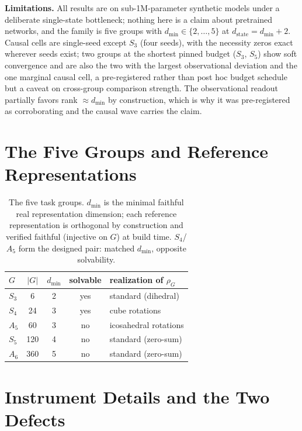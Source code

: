 \documentclass{article}
\newcommand{\dmin}{d_{\min}}
\newcommand{\dstate}{d_{\mathrm{state}}}
\begin{document}
\textbf{Limitations.} All results are on sub-1M-parameter synthetic
models under a deliberate single-state bottleneck; nothing here is a
claim about pretrained networks, and the family is five groups with
$\dmin \in \{2,\dots,5\}$ at $\dstate = \dmin + 2$. Causal cells are
single-seed except $S_3$ (four seeds), with the necessity zeros exact
wherever seeds exist; two groups at the shortest pinned budget ($S_3$,
$S_5$) show soft convergence and are also the two with the largest
observational deviation and the one marginal causal cell, a
pre-registered rather than post hoc budget schedule but a caveat on
cross-group comparison strength. The observational readout partially
favors rank $\approx \dmin$ by construction, which is why it was
pre-registered as corroborating and the causal wave carries the claim.





\appendix

\section{The Five Groups and Reference Representations}
\label{app:groups}

\begin{table}[H]
\centering
\small
\begin{tabular}{lcccl}
\toprule
$G$ & $|G|$ & $\dmin$ & solvable & realization of $\rho_G$ \\
\midrule
$S_3$ & 6   & 2 & yes & standard (dihedral) \\
$S_4$ & 24  & 3 & yes & cube rotations \\
$A_5$ & 60  & 3 & no  & icosahedral rotations \\
$S_5$ & 120 & 4 & no  & standard (zero-sum) \\
$A_6$ & 360 & 5 & no  & standard (zero-sum) \\
\bottomrule
\end{tabular}
\caption{The five task groups. $\dmin$ is the minimal faithful real
representation dimension; each reference representation is orthogonal by
construction and verified faithful (injective on $G$) at build time.
$S_4$/$A_5$ form the designed pair: matched $\dmin$, opposite
solvability.}
\label{tab:groups}
\end{table}

\section{Instrument Details and the Two Defects}
\label{app:instrument}
\end{document}
